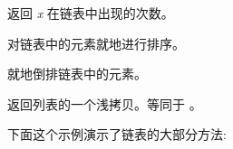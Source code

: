 \documentclass[a4paper,10pt,english]{sphinxmanual}
\begin{document}
\begin{fulllineitems}
返回 \emph{x} 在链表中出现的次数。

\end{fulllineitems}



\begin{fulllineitems}
对链表中的元素就地进行排序。

\end{fulllineitems}



\begin{fulllineitems}
就地倒排链表中的元素。

\end{fulllineitems}



\begin{fulllineitems}
返回列表的一个浅拷贝。等同于 。

\end{fulllineitems}


下面这个示例演示了链表的大部分方法:
\end{document}
